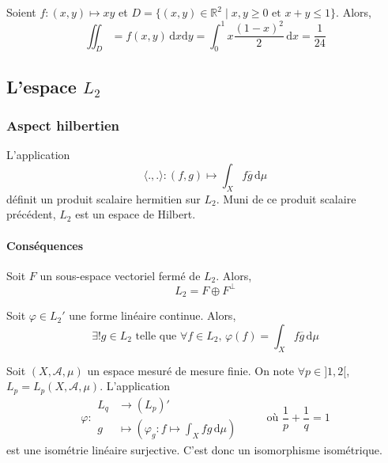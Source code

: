 
  \begin{example}
    Soient $f : (x,y) \mapsto xy$ et $D = \{ (x,y) \in \mathbb{R}^2 \mid x, y \geq 0 \text{ et } x + y \leq 1 \}$. Alors,
    \[ \iint_D = f(x,y) \, \mathrm{d}x \mathrm{d}y = \int_0^1 x \frac{(1-x)^2}{2} \, \mathrm{d}x = \frac{1}{24} \]
  \end{example}

  \subsection{L'espace \texorpdfstring{$L_2$}{L₂}}

  \subsubsection{Aspect hilbertien}


  \begin{definition}
    L'application
    \[ \langle ., . \rangle : (f,g) \mapsto \int_X f \overline{g} \, \mathrm{d}\mu \]
    définit un produit scalaire hermitien sur $L_2$. Muni de ce produit scalaire précédent, $L_2$ est un espace de Hilbert.
  \end{definition}

  \paragraph{Conséquences}

  \begin{theorem}
    Soit $F$ un sous-espace vectoriel fermé de $L_2$. Alors,
    \[ L_2 = F \oplus F^\perp \]
  \end{theorem}

  \begin{corollary}
    Soit $\varphi \in L_2'$ une forme linéaire continue. Alors,
    \[ \exists! g \in L_2 \text{ telle que } \forall f \in L_2, \, \varphi(f) = \int_X f \overline{g} \, \mathrm{d}\mu \]
  \end{corollary}


  \begin{application}[Dual de $L_p$]
    Soit $(X, \mathcal{A}, \mu)$ un espace mesuré de mesure finie. On note $\forall p \in ]1,2[$, $L_p = L_p(X, \mathcal{A}, \mu)$. L'application
    \[
    \varphi :
    \begin{array}{ll}
      L_q &\rightarrow (L_p)' \\
      g &\mapsto \left( \varphi_g : f \mapsto \int_X f g \, \mathrm{d}\mu \right)
    \end{array}
    \qquad \text{ où } \frac{1}{p} + \frac{1}{q} = 1
    \]
    est une isométrie linéaire surjective. C'est donc un isomorphisme isométrique.
  \end{application}

